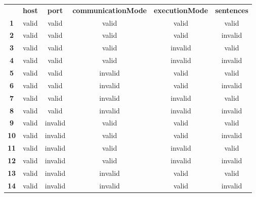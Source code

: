 \begin{table}[H]
    \small
    \begin{tabular}{cccccc}
        \textbf{}   & \textbf{host} & \textbf{port} & \textbf{communicationMode} & \textbf{executionMode} & \textbf{sentences} \\
        \textbf{1}  & valid         & valid         & valid                      & valid                  & valid              \\
        \textbf{2}  & valid         & valid         & valid                      & valid                  & invalid            \\
        \textbf{3}  & valid         & valid         & valid                      & invalid                & valid              \\
        \textbf{4}  & valid         & valid         & valid                      & invalid                & invalid            \\
        \textbf{5}  & valid         & valid         & invalid                    & valid                  & valid              \\
        \textbf{6}  & valid         & valid         & invalid                    & valid                  & invalid            \\
        \textbf{7}  & valid         & valid         & invalid                    & invalid                & valid              \\
        \textbf{8}  & valid         & valid         & invalid                    & invalid                & invalid            \\
        \textbf{9}  & valid         & invalid       & valid                      & valid                  & valid              \\
        \textbf{10} & valid         & invalid       & valid                      & valid                  & invalid            \\
        \textbf{11} & valid         & invalid       & valid                      & invalid                & valid              \\
        \textbf{12} & valid         & invalid       & valid                      & invalid                & invalid            \\
        \textbf{13} & valid         & invalid       & invalid                    & valid                  & valid              \\
        \textbf{14} & valid         & invalid       & invalid                    & valid                  & invalid            \\

\end{tabular}
\end{table}
